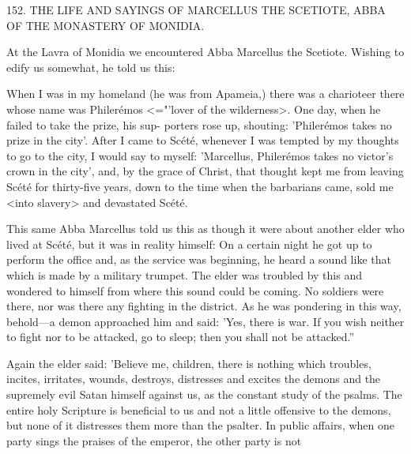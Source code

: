 152. THE LIFE AND SAYINGS OF MARCELLUS
THE SCETIOTE, ABBA OF THE
MONASTERY OF MONIDIA.

At the Lavra of Monidia we encountered Abba Marcellus the
Scetiote. Wishing to edify us somewhat, he told us this:

When I was in my homeland (he was from Apameia,) there was a
charioteer there whose name was Philerémos <="'lover of the
wilderness>. One day, when he failed to take the prize, his sup-
porters rose up, shouting: 'Philerémos takes no prize in the city'.
After I came to Scété, whenever I was tempted by my thoughts to
go to the city, I would say to myself: 'Marcellus, Philerémos takes
no victor's crown in the city', and, by the grace of Christ, that
thought kept me from leaving Scété for thirty-five years, down to
the time when the barbarians came, sold me <into slavery> and
devastated Scété.

This same Abba Marcellus told us this as though it were about
another elder who lived at Scété, but it was in reality himself: On a
certain night he got up to perform the office and, as the service was
beginning, he heard a sound like that which is made by a military
trumpet. The elder was troubled by this and wondered to himself
from where this sound could be coming. No soldiers were there, nor
was there any fighting in the district. As he was pondering in this
way, behold—a demon approached him and said: 'Yes, there is war.
If you wish neither to fight nor to be attacked, go to sleep; then you
shall not be attacked.”

Again the elder said: 'Believe me, children, there is nothing
which troubles, incites, irritates, wounds, destroys, distresses and
excites the demons and the supremely evil Satan himself against us,
as the constant study of the psalms. The entire holy Scripture is
beneficial to us and not a little offensive to the demons, but none of
it distresses them more than the psalter. In public affairs, when one
party sings the praises of the emperor, the other party is not

